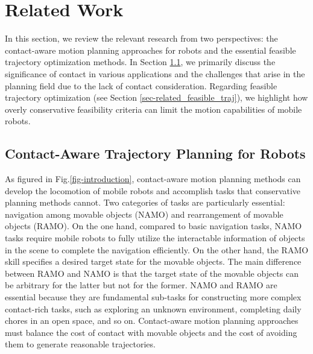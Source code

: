 \section{Related Work}
In this section, we review the relevant research from two perspectives: the contact-aware motion planning approaches for robots and the essential feasible trajectory optimization methods. In Section
\ref{sec-related_contact_traj}, we primarily discuss the significance of contact in various applications and the challenges that arise in the planning field due to the lack of contact consideration. Regarding feasible trajectory optimization (see Section \ref{sec-related_feasible_traj}), we highlight how overly conservative feasibility criteria can limit the motion capabilities of mobile robots.
\subsection{Contact-Aware Trajectory Planning for Robots}
\label{sec-related_contact_traj}
As figured in Fig.\ref{fig-introduction}, contact-aware motion planning methods can develop the locomotion of mobile robots and accomplish tasks that conservative planning methods cannot. Two categories of tasks are particularly essential: navigation among movable objects (NAMO) and rearrangement of movable objects (RAMO). 
On the one hand, compared to basic navigation tasks, NAMO tasks require mobile robots to fully utilize the interactable information of objects in the scene to complete the navigation efficiently. %
On the other hand, the RAMO skill specifies a desired target state for the movable objects. The main difference between RAMO and NAMO is that the target state of the movable objects can be arbitrary for the latter but not for the former. NAMO and RAMO are essential because they are fundamental sub-tasks for constructing more complex contact-rich tasks, such as exploring an unknown environment, %
completing daily chores in an open space, %
and so on. Contact-aware motion planning approaches must balance the cost of contact with movable objects and the cost of avoiding them to generate reasonable trajectories.

